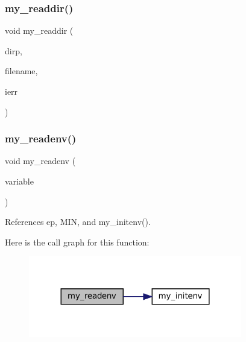 \subsubsection{\texorpdfstring{my\+\_\+readdir()}{my\_readdir()}}
{\footnotesize\ttfamily void my\+\_\+readdir (\begin{DoxyParamCaption}\item[{D\+IR $\ast$}]{dirp,  }\item[{char $\ast$}]{filename,  }\item[{int $\ast$}]{ierr }\end{DoxyParamCaption})}

\mbox{\label{C-M__system_8c_a0114eece06797ba0c5e6f5948841501a}} 
\subsubsection{\texorpdfstring{my\+\_\+readenv()}{my\_readenv()}}
{\footnotesize\ttfamily void my\+\_\+readenv (\begin{DoxyParamCaption}\item[{char $\ast$}]{variable }\end{DoxyParamCaption})}



References ep, M\+IN, and my\+\_\+initenv().

Here is the call graph for this function\+:\nopagebreak
\begin{figure}[H]
\begin{center}
\leavevmode
\includegraphics[width=264pt]{C-M__system_8c_a0114eece06797ba0c5e6f5948841501a_cgraph}
\end{center}
\end{figure}
\mbox{\label{C-M__system_8c_a3cdda415df9f1522e545474e11c78a5c}} 

